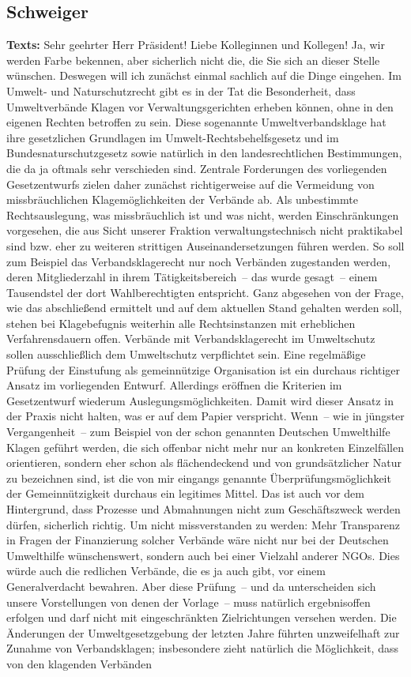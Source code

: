 \documentclass{article}
\begin{document}
\subsection{Schweiger}
\noindent\textbf{Texts:} Sehr geehrter Herr Präsident! Liebe Kolleginnen und Kollegen! Ja, wir werden Farbe bekennen, aber sicherlich nicht die, die Sie sich an dieser Stelle wünschen. Deswegen will ich zunächst einmal sachlich auf die Dinge eingehen. Im Umwelt- und Naturschutzrecht gibt es in der Tat die Besonderheit, dass Umweltverbände Klagen vor Verwaltungsgerichten erheben können, ohne in den eigenen Rechten betroffen zu sein. Diese sogenannte Umweltverbandsklage hat ihre gesetzlichen Grundlagen im Umwelt-Rechtsbehelfsgesetz und im Bundesnaturschutzgesetz sowie natürlich in den landesrechtlichen Bestimmungen, die da ja oftmals sehr verschieden sind. Zentrale Forderungen des vorliegenden Gesetzentwurfs zielen daher zunächst richtigerweise auf die Vermeidung von missbräuchlichen Klagemöglichkeiten der Verbände ab. Als unbestimmte Rechtsauslegung, was missbräuchlich ist und was nicht, werden Einschränkungen vorgesehen, die aus Sicht unserer Fraktion verwaltungstechnisch nicht praktikabel sind bzw. eher zu weiteren strittigen Auseinandersetzungen führen werden. So soll zum Beispiel das Verbandsklagerecht nur noch Verbänden zugestanden werden, deren Mitgliederzahl in ihrem Tätigkeitsbereich – das wurde gesagt – einem Tausendstel der dort Wahlberechtigten entspricht. Ganz abgesehen von der Frage, wie das abschließend ermittelt und auf dem aktuellen Stand gehalten werden soll, stehen bei Klagebefugnis weiterhin alle Rechtsinstanzen mit erheblichen Verfahrensdauern offen. Verbände mit Verbandsklagerecht im Umweltschutz sollen ausschließlich dem Umweltschutz verpflichtet sein. Eine regelmäßige Prüfung der Einstufung als gemeinnützige Organisation ist ein durchaus richtiger Ansatz im vorliegenden Entwurf. Allerdings eröffnen die Kriterien im Gesetzentwurf wiederum Auslegungsmöglichkeiten. Damit wird dieser Ansatz in der Praxis nicht halten, was er auf dem Papier verspricht. Wenn – wie in jüngster Vergangenheit – zum Beispiel von der schon genannten Deutschen Umwelthilfe Klagen geführt werden, die sich offenbar nicht mehr nur an konkreten Einzelfällen orientieren, sondern eher schon als flächendeckend und von grundsätzlicher Natur zu bezeichnen sind, ist die von mir eingangs genannte Überprüfungsmöglichkeit der Gemeinnützigkeit durchaus ein legitimes Mittel. Das ist auch vor dem Hintergrund, dass Prozesse und Abmahnungen nicht zum Geschäftszweck werden dürfen, sicherlich richtig. Um nicht missverstanden zu werden: Mehr Transparenz in Fragen der Finanzierung solcher Verbände wäre nicht nur bei der Deutschen Umwelthilfe wünschenswert, sondern auch bei einer Vielzahl anderer NGOs. Dies würde auch die redlichen Verbände, die es ja auch gibt, vor einem Generalverdacht bewahren.  Aber diese Prüfung – und da unterscheiden sich unsere Vorstellungen von denen der Vorlage – muss natürlich ergebnisoffen erfolgen und darf nicht mit eingeschränkten Zielrichtungen versehen werden. Die Änderungen der Umweltgesetzgebung der letzten Jahre führten unzweifelhaft zur Zunahme von Verbandsklagen; insbesondere zieht natürlich die Möglichkeit, dass von den klagenden Verbänden 
\end{document}
